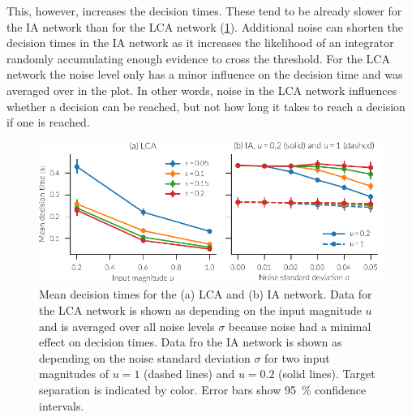 This, however, increases the decision times.
These tend to be already slower for the IA network than for the LCA network (\cref{fig:ia-time}).
Additional noise can shorten the decision times in the IA network as it increases the likelihood of an integrator randomly accumulating enough evidence to cross the threshold.
For the LCA network the noise level only has a minor influence on the decision time and was averaged over in the plot.
In other words, noise in the LCA network influences whether a decision can be reached, but not how long it takes to reach a decision if one is reached.
\begin{figure}
    \centering
    \includegraphics{figures/ia-time}
    \caption[Mean WTA decisions times.]{Mean decision times for the (a) LCA and (b) IA network. Data for the LCA network is shown as depending on the input magnitude $u$ and is averaged over all noise levels $\sigma$ because noise had a minimal effect on decision times. Data fro the IA network is shown as depending on the noise standard deviation $\sigma$ for two input magnitudes of $u = 1$ (dashed lines) and $u = 0.2$ (solid lines). Target separation is indicated by color. Error bars show \SI{95}{\percent} confidence intervals.}\label{fig:ia-time}
\end{figure}

